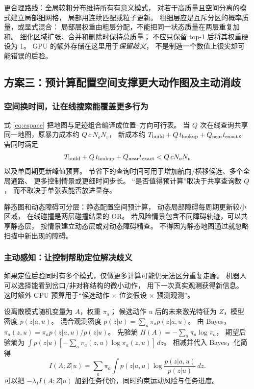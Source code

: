 更合理路线：全局较粗分布维持所有有意义模式，
对若干高质量且空间分离的模式建立局部细网格，
局部用连续匹配或粒子更新。
粗细层应是互斥分区的概率质量，或显式混合：
局部层权重由粗层分配，不能把同一状态质量在两层重复加和。
细化区域扩张、合并和删除时保持总质量；
不应只保留 top-1 后将其权重硬设为 1。
GPU 的额外存储在这里用于\emph{保留歧义}，
不是制造一个数值上很尖却可能错误的后验。

\subsection{方案三：预计算配置空间支撑更大动作图及主动消歧}
\subsubsection{空间换时间，让在线搜索能覆盖更多行为}
式 \eqref{eq:cspace} 把地图与足迹组合编译成位置--方向可行表。
当 $Q$ 次在线查询共享同一地图，原暴力成本约
$Q\,c\,N_oN_v$，
新成本约
$T_{\rm build}+Q\,t_{\rm lookup}+Q_{\rm near}t_{\rm exact}$。
需同时满足
\begin{equation}
T_{\rm build}+Q\,t_{\rm lookup}+Q_{\rm near}t_{\rm exact}
<Q\,cN_oN_v
\end{equation}
以及单周期更新峰值预算。
节省下的查询时间可用于增加航向/横移候选、多个全局通路、
更多控制情景或更细时间步长。
“是否值得预计算”取决于共享查询数 $Q$，
而不取决于单张表能否放进显存。

静态图和动态障碍可分层：静态配置空间预计算，
动态局部障碍每周期更新较小区域，
在线碰撞是两层碰撞结果的 OR。
若风险情景包含不同障碍轨迹，可以共享静态层，
按情景建立动态层或对动态障碍精查。
不得因为静态地图通过就忽略扫描中新出现的障碍。

\subsubsection{主动感知：让控制帮助定位解决歧义}
如果定位后验同时有多个模式，仅做更多计算可能仍无法区分重复走廊。
机器人可以选择能看到岔口/非对称结构的微小动作，
用下一次真实观测获得新信息。
这时额外 GPU 预算用于“候选动作 $\times$ 位姿假设 $\times$ 预测观测”。

设离散模式随机变量为 $A$，权重 $\pi_a$；
候选动作 $u$ 后的未来激光特征为 $Z$，模型密度 $p(z|a,u)$。
混合观测密度
$p(z|u)=\sum_a\pi_ap(z|a,u)$。
由 Bayes，
$\pi_a(z,u)=\pi_ap(z|a,u)/p(z|u)$。
先验熵 $H(A)=-\sum_a\pi_a\log\pi_a$，
期望后验熵为 $\int p(z|u)[-\sum_a\pi_a(z,u)\log\pi_a(z,u)]\,dz$。
相减并代入 Bayes，化简得
\begin{equation}
I(A;Z|u)=
\sum_a\pi_a\int p(z|a,u)
\log\frac{p(z|a,u)}{p(z|u)}\,dz.
\label{eq:infogain}
\end{equation}
可以把 $-\lambda_I I(A;Z|u)$ 加到任务代价，同时约束运动风险与任务进度。

